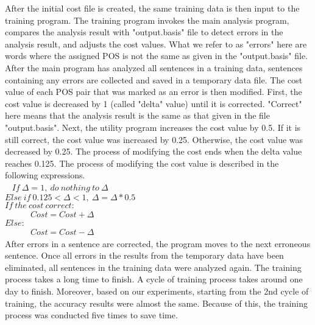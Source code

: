 \documentclass[english]{nlp}
\begin{document}
After the initial cost file is created, the same training data is then
input to the training program.
The training program invokes the main analysis program, compares the analysis
result with "output.basis" file to detect errors in the analysis result,
and adjusts the cost values.
What we refer to as "errors" here are words where the assigned POS is not the same as
given in the "output.basis" file.
After the main program has analyzed all sentences in a training data,
sentences containing any errors are collected and saved in a
temporary data file. 
The cost value of each POS pair that was marked as an error is then modified.
First, the cost value is decreased by 1 (called "delta" value) until
it is corrected. "Correct" here means that the analysis
result is the same as that given in the file "output.basis".
Next, the utility program increases the cost value by 0.5.
If it is still correct, the cost value was increased by 0.25.
Otherwise, the cost value was decreased by 0.25.
The process of modifying the cost ends when the delta value reaches
0.125.
The process of modifying the cost value is described in the following expressions.\\
~\vspace{-0.1mm}
$If~\Delta = 1,~do~nothing~to~\Delta$\\
$Else~if~0.125 < \Delta < 1,~\Delta = \Delta * 0.5$\\
$If~the~cost~correct:$\\
~~~~~~$Cost = Cost + \Delta$\\
$Else:$\\
~~~~~~$Cost = Cost - \Delta$\\

After errors in a sentence are corrected, the program moves to the
next erroneous sentence. Once all errors in the results from the temporary data
have been eliminated, all sentences in the training data
were analyzed again.
The training process takes a long time to finish.
A cycle of training process takes around one day to finish.
Moreover, based on our experiments, starting from the 2nd cycle of training,
the accuracy results were almost the same.
Because of this, the training process was conducted five times to save
time.
\end{document}

